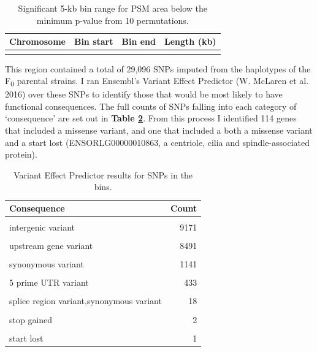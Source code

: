 \documentclass[
]{book}
\begin{document}
\begin{table}

\caption{\label{tab:somite-sig-psm-tbl}Significant 5-kb bin range for PSM area below the minimum p-value from 10 permutations.}
\centering
\begin{tabular}[t]{rrrr}
\toprule
Chromosome & Bin start & Bin end & Length (kb)\\
\midrule
\cellcolor{gray!6}{3} & \cellcolor{gray!6}{20375001} & \cellcolor{gray!6}{26285000} & \cellcolor{gray!6}{5910}\\
\bottomrule
\end{tabular}
\end{table}

This region contained a total of 29,096 SNPs imputed from the haplotypes of the F\textsubscript{0} parental strains. I ran Ensembl's Variant Effect Predictor (W. McLaren et al. 2016) over these SNPs to identify those that would be most likely to have functional consequences. The full counts of SNPs falling into each category of `consequence' are set out in \textbf{Table \ref{tab:psm-consequence-tbl}}. From this process I identified 114 genes that included a missense variant, and one that included a both a missense variant and a start lost (ENSORLG00000010863, a centriole, cilia and spindle-associated protein).

\begin{table}

\caption{\label{tab:psm-consequence-tbl}Variant Effect Predictor results for SNPs in the bins.}
\centering
\begin{tabular}[t]{lr}
\toprule
Consequence & Count\\
\midrule
\cellcolor{gray!6}{intron variant} & \cellcolor{gray!6}{23189}\\
intergenic variant & 9171\\
\cellcolor{gray!6}{downstream gene variant} & \cellcolor{gray!6}{8894}\\
upstream gene variant & 8491\\
\cellcolor{gray!6}{3 prime UTR variant} & \cellcolor{gray!6}{2104}\\
\addlinespace
synonymous variant & 1141\\
\cellcolor{gray!6}{missense variant} & \cellcolor{gray!6}{716}\\
5 prime UTR variant & 433\\
\cellcolor{gray!6}{splice region variant,intron variant} & \cellcolor{gray!6}{184}\\
splice region variant,synonymous variant & 18\\
\addlinespace
\cellcolor{gray!6}{missense variant,splice region variant} & \cellcolor{gray!6}{7}\\
stop gained & 2\\
\cellcolor{gray!6}{splice donor variant} & \cellcolor{gray!6}{1}\\
start lost & 1\\
\bottomrule
\end{tabular}
\end{table}
\end{document}

